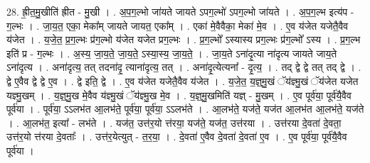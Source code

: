 \documentclass[17pt]{extarticle}
\begin{document}
28. ह्री॒त॒मु॒खीति॑ ह्रीत - मु॒खी । . अ॒प॒ग॒ल्भो जा॑यते जायते ऽपग॒ल्भो॑ ऽपग॒ल्भो जा॑यते । . अ॒प॒ग॒ल्भ इत्य॑प - ग॒ल्भः । . जा॒य॒त॒ एका॒ मेका᳚म् जायते जायत॒ एका᳚म् । . एका॑ मे॒वैवैका॒ मेका॑ मे॒व । . ए॒व य॑जेत यजेतै॒वैव य॑जेत । . य॒जे॒त॒ प्र॒ग॒ल्भः प्र॑ग॒ल्भो य॑जेत यजेत प्रग॒ल्भः । . प्र॒ग॒ल्भो᳚ ऽस्यास्य प्रग॒ल्भः प्र॑ग॒ल्भो᳚ ऽस्य । . प्र॒ग॒ल्भ इति॑ प्र - ग॒ल्भः । . अ॒स्य॒ जा॒य॒ते॒ जा॒य॒ते॒ ऽस्या॒स्य॒ जा॒य॒ते॒ । . जा॒य॒ते ऽना॑दृ॒त्या ना॑दृत्य जायते जाय॒ते ऽना॑दृत्य । . अना॑दृत्य॒ तत् तदना॑दृ॒ त्याना॑दृत्य॒ तत् । . अना॑दृ॒त्येत्यना᳚ - दृ॒त्य॒ । . तद् द्वे द्वे तत् तद् द्वे । . द्वे ए॒वैव द्वे द्वे ए॒व । . द्वे इति॒ द्वे । . ए॒व य॑जेत यजेतै॒वैव य॑जेत । . य॒जे॒त॒ य॒ज्ञ्॒मु॒खं ॅय॑ज्ञ्मु॒खं ॅय॑जेत यजेत यज्ञ्मु॒खम् । . य॒ज्ञ्॒मु॒ख मे॒वैव य॑ज्ञ्मु॒खं ॅय॑ज्ञ्मु॒ख मे॒व । . य॒ज्ञ्॒मु॒खमिति॑ यज्ञ् - मु॒खम् । . ए॒व पूर्व॑या॒ पूर्व॑यै॒वैव पूर्व॑या । . पूर्व॑या॒ ऽऽलभ॑त आ॒लभ॑ते॒ पूर्व॑या॒ पूर्व॑या॒ ऽऽलभ॑ते । . आ॒लभ॑ते॒ यज॑ते॒ यज॑त आ॒लभ॑त आ॒लभ॑ते॒ यज॑ते । . आ॒लभ॑त॒ इत्या᳚ - लभ॑ते । . यज॑त॒ उत्त॑र॒यो त्त॑रया॒ यज॑ते॒ यज॑त॒ उत्त॑रया । . उत्त॑रया दे॒वता॑ दे॒वता॒ उत्त॑र॒यो त्त॑रया दे॒वताः᳚ । . उत्त॑र॒येत्युत् - त॒र॒या॒ । . दे॒वता॑ ए॒वैव दे॒वता॑ दे॒वता॑ ए॒व । . ए॒व पूर्व॑या॒ पूर्व॑यै॒वैव पूर्व॑या । \newline
\end{document}
